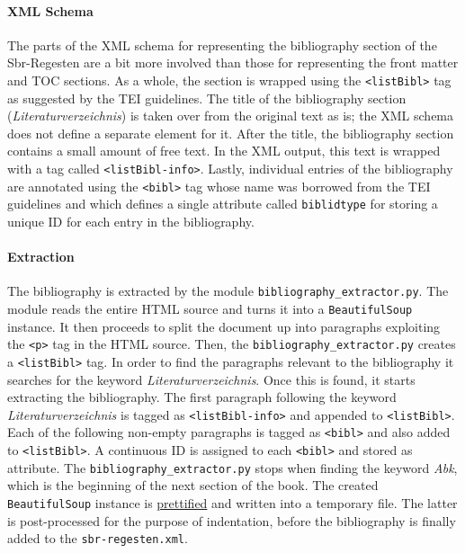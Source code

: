 \paragraph{XML Schema}

The parts of the XML schema for representing the bibliography section
of the Sbr-Regesten are a bit more involved than those for
representing the front matter and TOC sections. As a whole, the
section is wrapped using the \texttt{<listBibl>} tag as suggested by
the TEI guidelines. The title of the bibliography section
(\emph{Literaturverzeichnis}) is taken over from the original text as
is; the XML schema does not define a separate element for it. After
the title, the bibliography section contains a small amount of free
text. In the XML output, this text is wrapped with a tag called
\texttt{<listBibl-info>}. Lastly, individual entries of the
bibliography are annotated using the \texttt{<bibl>} tag whose name
was borrowed from the TEI guidelines and which defines a single
attribute called \texttt{biblidtype} for storing a unique ID for each
entry in the bibliography.

\paragraph{Extraction}

The bibliography is extracted by the module
\texttt{bibliography\_extractor.py}. The module reads the entire HTML
source and turns it into a \texttt{BeautifulSoup} instance. It then
proceeds to split the document up into paragraphs exploiting the
\texttt{<p>} tag in the HTML source. Then, the
\texttt{bibliography\_extractor.py} creates a \texttt{<listBibl>} tag.
In order to find the paragraphs relevant to the bibliography it
searches for the keyword \emph{Literaturverzeichnis}. Once this is
found, it starts extracting the bibliography. The first paragraph
following the keyword \emph{Literaturverzeichnis} is tagged as
\texttt{<listBibl-info>} and appended to \texttt{<listBibl>}. Each
of the following non-empty paragraphs is tagged as \texttt{<bibl>}
and also added to \texttt{<listBibl>}. A continuous ID is 
assigned to each \texttt{<bibl>} and stored as attribute. The 
\texttt{bibliography\_extractor.py} stops when finding the keyword
\emph{Abk}, which is the beginning of the next section of the book.
The created \texttt{BeautifulSoup} instance is
\href{http://www.crummy.com/software/BeautifulSoup/bs4/doc/#pretty-printing}{prettified}
and written into a temporary file. The latter is post-processed for
the purpose of indentation, before the bibliography is finally added
to the \texttt{sbr-regesten.xml}.

